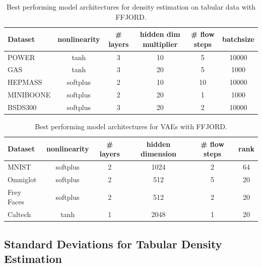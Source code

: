 \documentclass{article} %
\newcommand{\methodname}{FFJORD\xspace}
\newcommand\0{\kern-1.2pt\vec{\kern1.2pt 0}}
\begin{document}
\begin{appendices}
\begin{table}[H]\centering
\renewcommand{\arraystretch}{1.3}
\begin{tabular}{l|ccccc}%
Dataset & nonlinearity & \# layers & hidden dim multiplier & \# flow steps & batchsize \\
\midrule
POWER     & tanh     & 3 & 10 & 5  & 10000 \\
GAS       & tanh     & 3 & 20 & 5  & 1000 \\
HEPMASS   & softplus & 2 & 10 & 10 & 10000 \\
MINIBOONE & softplus & 2 & 20 & 1  & 1000 \\
BSDS300   & softplus & 3 & 20 & 2  & 10000
\end{tabular}
\caption{Best performing model architectures for density estimation on tabular data with \methodname.}
\label{tab:tabulararch}
\end{table}

\begin{table}[H]\centering
\renewcommand{\arraystretch}{1.3}
\begin{tabular}{l|ccccc}%
Dataset & nonlinearity & \# layers & hidden dimension & \# flow steps & rank \\
\midrule
MNIST      & softplus & 2 & 1024 & 2 & 64\\
Omniglot   & softplus & 2 & 512  & 5 & 20\\
Frey Faces & softplus & 2 & 512  & 2 & 20\\
Caltech    & tanh     & 1 & 2048 & 1 & 20
\end{tabular}
\caption{Best performing model architectures for VAEs with \methodname.}
\label{tab:vaearch}
\end{table}

\subsection{Standard Deviations for Tabular Density Estimation}\label{sec:tabular_stdev}


\end{appendices}
\end{document}
